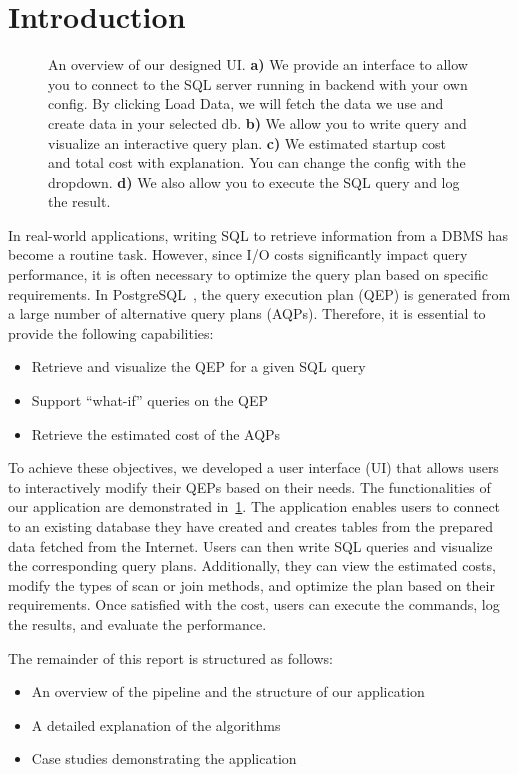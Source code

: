 \section{Introduction}
\label{sec:intro}

\begin{figure}
    \centering
    \caption{An overview of our designed UI. \textbf{a)} We provide an interface to allow you to connect to the SQL server running in backend with your own config. By clicking Load Data, we will fetch the data we use and create data in your selected db. \textbf{b)} We allow you to write query and visualize an interactive query plan. \textbf{c)} We estimated startup cost and total cost with explanation. You can change the config with the dropdown. \textbf{d)} We also allow you to execute the SQL query and log the result.}
    \label{fig:Overview}
\end{figure}

In real-world applications, writing SQL to retrieve information from a DBMS has become a routine task. However, since I/O costs significantly impact query performance, it is often necessary to optimize the query plan based on specific requirements. In PostgreSQL~\citep{postgres_github}, the query execution plan (QEP) is generated from a large number of alternative query plans (AQPs). Therefore, it is essential to provide the following capabilities:

\begin{itemize} 
    \item Retrieve and visualize the QEP for a given SQL query 
    \item Support ``what-if'' queries on the QEP 
    \item Retrieve the estimated cost of the AQPs 
\end{itemize}

To achieve these objectives, we developed a user interface (UI) that allows users to interactively modify their QEPs based on their needs. The functionalities of our application are demonstrated in~\cref{fig:Overview}. The application enables users to connect to an existing database they have created and creates tables from the prepared data fetched from the Internet. Users can then write SQL queries and visualize the corresponding query plans. Additionally, they can view the estimated costs, modify the types of scan or join methods, and optimize the plan based on their requirements. Once satisfied with the cost, users can execute the commands, log the results, and evaluate the performance.

The remainder of this report is structured as follows:

\begin{itemize} 
    \item An overview of the pipeline and the structure of our application
    \item A detailed explanation of the algorithms
    \item Case studies demonstrating the application
\end{itemize}

